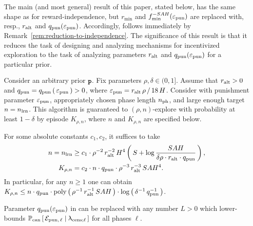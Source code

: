 The main (and most general) result of this paper, stated below, has the same shape as  for reward-independence, but
    $r_{\min}$ and $f_{\min}^{-SAH}(\varepsilon_{\mathrm{pun}})$
are replaced with, resp., $r_{\mathrm{alt}}$ and $q_{\mathrm{pun}}(\varepsilon_{\mathrm{pun}})$. Accordingly,  follows immediately by Remark~\ref{rem:reduction-to-independence}. The significance of this result is that it reduces the task of designing and analyzing  mechanisms for  incentivized exploration to the task of analyzing parameters $r_{\mathrm{alt}}$ and $q_{\mathrm{pun}}(\varepsilon_{\mathrm{pun}})$ for a particular prior.

\begin{theorem}\label{thm:main_prob_mdp}
Consider an arbitrary prior ${\normalfont \texttt{\textbf{p}}}$. Fix parameters $\rho, \delta\in (0,1]$. Assume that $r_{\mathrm{alt}}>0$ and
    $q_{\mathrm{pun}} = q_{\mathrm{pun}}\left(\,\varepsilon_{\mathrm{pun}}\,\right)>0$,
where
    $\varepsilon_{\mathrm{pun}} = r_{\mathrm{alt}}\,\rho\,/\, 18\,H$.
Consider  with punishment parameter $\varepsilon_{\mathrm{pun}}$, appropriately chosen phase length $n_{\mathrm{ph}}$, and large enough target $n=n_{\mathrm{lrn}}$. This algorithm is guaranteed to $(\rho,n)$-explore with probability at least $1-\delta$ by episode $K_{\rho,n}$, where $n$ and $K_{\rho,n}$ are specified below.


For some absolute constants $c_1,c_2$, it suffices to take
\begin{align}
n=n_{\mathrm{lrn}} &\ge
     c_1\cdot \rho^{-2}\, r_{\mathrm{alt}}^{-2}\,H^4
        \left(\, S + \log \frac{SAH}{\delta\rho\cdot r_{\mathrm{alt}}\cdot q_{\mathrm{pun}}} \,\right),
        \label{eq:thm:main_prob_mdp-n} \\
K_{\rho,n} &= c_2\cdot n\cdot q_{\mathrm{pun}} \cdot \rho^{-3}\, r_{\mathrm{alt}}^{-3}\, SAH^4.
    \label{eq:thm:main_prob_mdp-K}
\end{align}
In particular, for any $n\geq 1$ one can obtain
 $K_{\rho,n} \leq n\cdot \qpunish
        \cdot \poly\rbr{\rho^{-1}\, \ralt^{-1}\, SAH  }
        \cdot \log\rbr{\delta^{-1}\,\qpunish^{-1}}$.
 \end{theorem}


\begin{remark}\label{rem:replace-qpun}
{Parameter $q_{\mathrm{pun}}(\varepsilon_{\mathrm{pun}})$ in  can be replaced with any number $L>0$ which lower-bounds
    $\operatorname{\mathbb{P}}_{\mathrm{can}}\left[\, \mathcal{E}_{\mathrm{pun},\,\ell}\mid \uplambda_{\mathrm{cens};\ell}\,\right]$
for all phases $\ell$.}
\end{remark}

